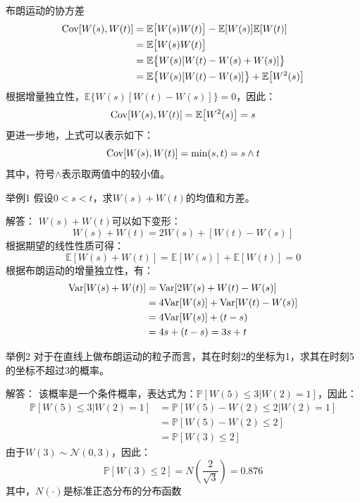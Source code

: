 \documentclass[t]{beamer}
\renewcommand{\Pr}{\mathbb{P}}
\newcommand{\E}{\mathbb{E}}
\newcommand{\Var}{{\rm Var}}
\begin{document}
\begin{frame}{布朗运动的协方差}
  \[\begin{split}
    {\rm Cov}[W(s),W(t)]&=\E \big[W(s)W(t)\big]-\E [W(s)]\E [W(t)]\\
    &=\E \big[W(s)W(t)\big]\\
    &=\E \big\{W(s)[W(t)-W(s)+W(s)]\big\}\\
    &=\E \big\{W(s)[W(t)-W(s)]\big\}+\E \big[W^2(s)\big]\\
    \end{split} \]
    根据增量独立性，$\E \big\{W(s)[W(t)-W(s)]\big\}=0$，因此：
    \[{\rm Cov}[W(s),W(t)]=\E \big[W^2(s)\big]=s\]
    更进一步地，上式可以表示如下：
    \[{\rm Cov}[W(s),W(t)]=\min(s,t)=s\wedge t\]
    其中，符号$\wedge$表示取两值中的较小值。
\end{frame}


\begin{frame}{举例1}\small
  假设$0<s<t$，求$W(s)+W(t)$的均值和方差。

  \begin{block}{解答：}
    $W(s)+W(t)$可以如下变形：
\[W(s)+W(t)=2W(s)+[W(t)-W(s)] \]
根据期望的线性性质可得：
\[\E[W(s)+W(t)]=\E[W(s)]+\E[W(t)]=0 \]
根据布朗运动的增量独立性，有：
\[\begin{split}
\Var[W(s)+W(t)]&=\Var[2W(s)+W(t)-W(s)]\\
&=4\Var[W(s)]+\Var[W(t)-W(s)]\\
&=4\Var[W(s)]+(t-s)\\
&=4s+(t-s)=3s+t
\end{split} \]
  \end{block}
\end{frame}


\begin{frame}{举例2}\small
  对于在直线上做布朗运动的粒子而言，其在时刻2的坐标为1，求其在时刻5的坐标不超过3的概率。
  \begin{block}{解答：}
    该概率是一个条件概率，表达式为：$\Pr[W(5)\le 3|W(2)=1]$，因此：
    \[\begin{split}
    \Pr[W(5)\le 3|W(2)=1]&=\Pr[W(5)-W(2)\le 2|W(2)=1]\\
    &=\Pr[W(5)-W(2)\le 2]\\
    &=\Pr[W(3)\le 2]
    \end{split} \]
    由于$W(3)\sim \mathcal{N}(0,3)$，因此：
    \[\Pr[W(3)\le 2]=N\left(\frac{2}{\sqrt{3}}\right)=0.876\]
    其中，$N(\cdot)$是标准正态分布的分布函数
  \end{block}
\end{frame}
\end{document}
